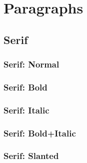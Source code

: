 \chapter{Paragraphs}

\section{Serif}
\subsection{Serif: Normal}
\begin{rmfamily}
    \blindtext
\end{rmfamily}

\subsection{Serif: Bold}
\begin{rmfamily}
    \begin{bfseries}
        \blindtext
    \end{bfseries}
\end{rmfamily}

\subsection{Serif: Italic}
\begin{rmfamily}
    \begin{itshape}
        \blindtext
    \end{itshape}
\end{rmfamily}

\subsection{Serif: Bold+Italic}
\begin{rmfamily}
    \begin{bfseries}
        \begin{itshape}
            \blindtext
        \end{itshape}
    \end{bfseries}
\end{rmfamily}

\subsection{Serif: Slanted}
\begin{rmfamily}
    \begin{slshape}
        \blindtext
    \end{slshape}
\end{rmfamily}

